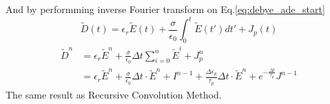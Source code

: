 And by performming inverse Fourier transform on Eq.\ref{eq:debye_ade_start}
\begin{equation}
  \widetilde{D}(t) = \epsilon_r\widetilde{E}(t) + \frac{\sigma}{\epsilon_0} \int_0^t\widetilde{E}(t')dt' + J_p(t)
\end{equation}
\begin{equation}
  \begin{split}
    \widetilde{D}^n & = \epsilon_r\widetilde{E}^n + \frac{\sigma}{\epsilon_0}\Delta t\sum_{i=0}^n\widetilde{E}^i + J_p^n\\
    & = \epsilon_r\widetilde{E}^n + \frac{\sigma}{\epsilon_0}\Delta t\cdot\widetilde{E}^n + I^{n-1} + \frac{\Delta\epsilon_p}{\tau_p}\Delta t\cdot\widetilde{E}^n + e^{-\frac{\Delta t}{\tau_p}}J^{n-1}
  \end{split}
\end{equation}
The same result as Recursive Convolution Method.
